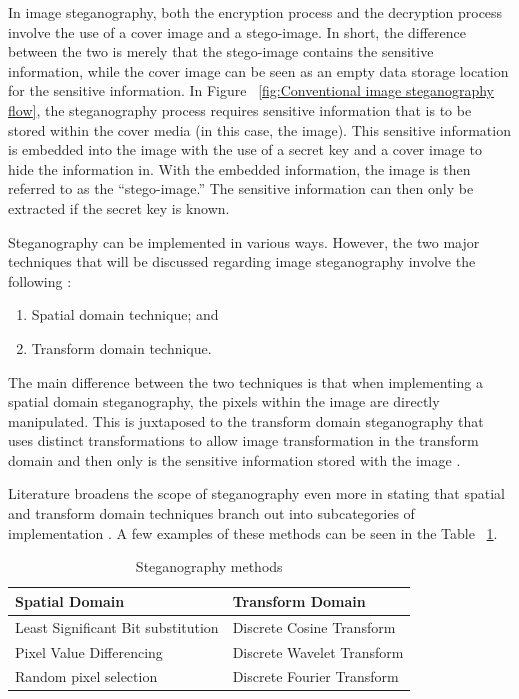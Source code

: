In image steganography, both the encryption process and the decryption process involve the use of a cover image and a stego-image. In short, the difference between the two is merely that the stego-image contains the sensitive information, while the cover image can be seen as an empty data storage location for the sensitive information. In Figure ~\ref{fig:Conventional image steganography flow}, the steganography process requires sensitive information that is to be stored within the cover media (in this case, the image). This sensitive information is embedded into the image with the use of a secret key and a cover image to hide the information in. With the embedded information, the image is then referred to as the “stego-image.” The sensitive information can then only be extracted if the secret key is known.

Steganography can be implemented in various ways. However, the two major techniques that will be discussed regarding image steganography involve the following \cite{Pradhan2016, Paul2012}:

\begin{enumerate}[label=\roman*.]
	\item Spatial domain technique; and 
	\item Transform domain technique.
\end{enumerate}

The main difference between the two techniques is that when implementing a spatial domain steganography, the pixels within the image are directly manipulated. This is juxtaposed to the transform domain steganography that uses distinct transformations to allow image transformation in the transform domain and then only is the sensitive information stored with the image \cite{Pradhan2016, Roy2016}.

Literature broadens the scope of steganography even more in stating that spatial and transform domain techniques branch out into subcategories of implementation \cite{Radha2011, SyedAhmad2012, Verma2016}. A few examples of these methods can be seen in the Table ~\ref{table: Steganography methods}.

\begin{table}[h]
\caption{Steganography methods}
\centering
 \begin{tabular}{|p{} | p{}|} 
 \hline
	\textbf{Spatial Domain} & \textbf{Transform Domain} \\ [1ex] 
 \hline\hline 
 Least Significant Bit substitution & Discrete Cosine Transform  \\[1ex]
 \hline 
 Pixel Value Differencing & Discrete Wavelet Transform  \\[1ex]
 \hline
 Random pixel selection & Discrete Fourier Transform  \\ [1ex] 
 \hline
 \end{tabular}
 \label{table: Steganography methods}
\end{table}


